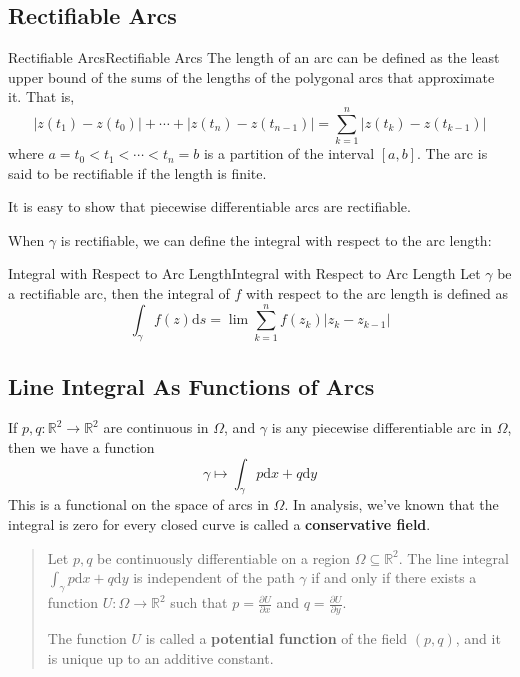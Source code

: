 \documentclass[../main.tex]{subfiles}
\begin{document}
\subsection{Rectifiable Arcs}
\begin{definition}{Rectifiable Arcs}{Rectifiable Arcs}
The length of an arc can be defined as the least upper bound of the sums of the lengths of the polygonal arcs that approximate it. That is,
\begin{equation*}
	\left|z(t_1)-z(t_0)\right| + \cdots + \left|z(t_n)-z(t_{n-1})\right| = \sum_{k=1}^n \left|z(t_k)-z(t_{k-1})\right|
\end{equation*}
where $a = t_0 < t_1 < \cdots < t_n = b$ is a partition of the interval $[a,b]$. The arc is said to be rectifiable if the length is finite.
\end{definition}

It is easy to show that piecewise differentiable arcs are rectifiable.

When $\gamma$ is rectifiable, we can define the integral with respect to the arc length:
\begin{definition}{Integral with Respect to Arc Length}{Integral with Respect to Arc Length}
	Let $\gamma$ be a rectifiable arc, then the integral of $f$ with respect to the arc length is defined as
	\begin{equation}
		\int_{\gamma} f(z) \mathrm{d} s = \lim \sum_{k=1}^n f(z_k) \left|z_k - z_{k-1}\right|
	\end{equation}
\end{definition}

\subsection{Line Integral As Functions of Arcs}
If $p,q: \mathbb{R}^2 \rightarrow \mathbb{R}^2$ are continuous in $\Omega$, and $\gamma$ is any piecewise differentiable arc in $\Omega$, then we have a function
\begin{equation}
	\gamma \mapsto \int_{\gamma} p \mathrm{d} x + q \mathrm{d} y
\end{equation}
This is a functional on the space of arcs in $\Omega$. In analysis, we've known that the integral is zero for every closed curve is called a \textbf{conservative field}.

\begin{quote}
	Let $p,q$ be continuously differentiable on a region $\Omega \subseteq \mathbb{R}^2$. The line integral $ \displaystyle \int_{\gamma} p \mathrm{d} x + q \mathrm{d} y$ is independent of the path $\gamma$ if and only if there exists a function $U: \Omega \rightarrow \mathbb{R}^2$ such that $\displaystyle p = \frac{\partial U}{\partial x}$ and $\displaystyle q = \frac{\partial U}{\partial y}$.

	The function $U$ is called a \textbf{potential function} of the field $(p,q)$, and it is unique up to an additive constant.
\end{quote}
\end{document}
